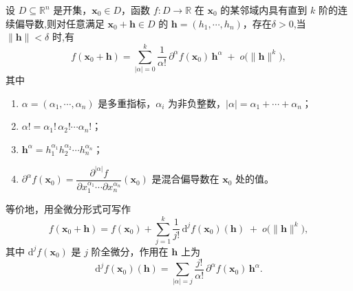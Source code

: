 \documentclass[../../main.tex]{subfiles}%
\begin{document}
\begin{theorem}[多元函数带Peano余项的Taylor公式]\label{theorem:多元函数带Peano余项的Taylor公式}
设 $D \subseteq \mathbb{R}^n$ 是开集，$\bm{x}_0 \in D$，函数 $f: D \to \mathbb{R}$ 在 $\bm{x}_0$ 的某邻域内具有直到 $k$ 阶的连续偏导数,则对任意满足 $\bm{x}_0 + \bm{h} \in D$ 的 $\bm{h} = (h_1,\cdots,h_n)$，存在$\delta>0$,当 $\|\bm{h}\| < \delta$ 时,有
\[
f(\bm{x}_0 + \bm{h}) = \sum_{|\alpha|=0}^{k} \frac{1}{\alpha!} \, \partial^\alpha f(\bm{x}_0) \, \bm{h}^\alpha \;+\; o\bigl(\|\bm{h}\|^k\bigr),
\]
其中
\begin{enumerate}[(1)]
\item $\alpha = (\alpha_1,\cdots,\alpha_n)$ 是多重指标，$\alpha_i$ 为非负整数，$|\alpha| = \alpha_1 + \cdots + \alpha_n$；
\item $\alpha! = \alpha_1! \,\alpha_2! \cdots \alpha_n!$；
\item $\bm{h}^\alpha = h_1^{\alpha_1} h_2^{\alpha_2} \cdots h_n^{\alpha_n}$；
\item $\partial^\alpha f(\bm{x}_0) = \dfrac{\partial^{|\alpha|} f}{\partial x_1^{\alpha_1} \cdots \partial x_n^{\alpha_n}}(\bm{x}_0)$ 是混合偏导数在 $\bm{x}_0$ 处的值。
\end{enumerate}
等价地，用全微分形式可写作
\[
f(\bm{x}_0 + \bm{h}) = f(\bm{x}_0) + \sum_{j=1}^{k} \frac{1}{j!}\, \mathrm{d}^j f(\bm{x}_0)(\bm{h}) \;+\; o\bigl(\|\bm{h}\|^k\bigr),
\]
其中 $\mathrm{d}^j f(\bm{x}_0)$ 是 $j$ 阶全微分，作用在 $\bm{h}$ 上为
\[
\mathrm{d}^j f(\bm{x}_0)(\bm{h}) = \sum_{|\alpha|=j} \frac{j!}{\alpha!} \, \partial^\alpha f(\bm{x}_0) \, \bm{h}^\alpha.
\]


\end{theorem}
\end{document}
